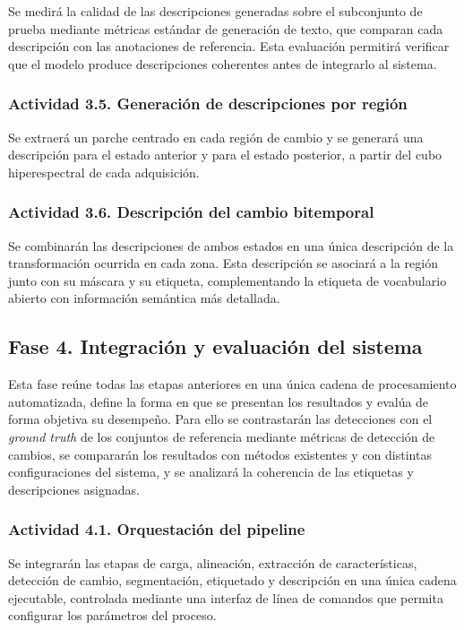 Se medirá la calidad de las descripciones generadas sobre el subconjunto de prueba mediante métricas estándar de generación de texto, que comparan cada descripción con las anotaciones de referencia. Esta evaluación permitirá verificar que el modelo produce descripciones coherentes antes de integrarlo al sistema.

\subsubsection{Actividad 3.5. Generación de descripciones por región}

Se extraerá un parche centrado en cada región de cambio y se generará una descripción para el estado anterior y para el estado posterior, a partir del cubo hiperespectral de cada adquisición.

\subsubsection{Actividad 3.6. Descripción del cambio bitemporal}

Se combinarán las descripciones de ambos estados en una única descripción de la transformación ocurrida en cada zona. Esta descripción se asociará a la región junto con su máscara y su etiqueta, complementando la etiqueta de vocabulario abierto con información semántica más detallada.

\subsection{Fase 4. Integración y evaluación del sistema}

Esta fase reúne todas las etapas anteriores en una única cadena de procesamiento automatizada, define la forma en que se presentan los resultados y evalúa de forma objetiva su desempeño. Para ello se contrastarán las detecciones con el \textit{ground truth} de los conjuntos de referencia mediante métricas de detección de cambios, se compararán los resultados con métodos existentes y con distintas configuraciones del sistema, y se analizará la coherencia de las etiquetas y descripciones asignadas.

\subsubsection{Actividad 4.1. Orquestación del pipeline}

Se integrarán las etapas de carga, alineación, extracción de características, detección de cambio, segmentación, etiquetado y descripción en una única cadena ejecutable, controlada mediante una interfaz de línea de comandos que permita configurar los parámetros del proceso.

